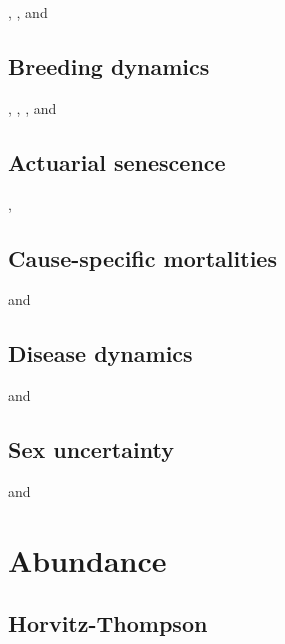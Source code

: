 \documentclass[
  12pt,
]{krantz}
\begin{document}
\citet{morano_life-history_2013}, \citet{shefferson_life_2003}, and \citet{cruz-flores_sex-specific_nodate}

\hypertarget{breeding-dynamics}{%
\section{Breeding dynamics}\label{breeding-dynamics}}

\citet{pradel_breeding_2012}, \citet{desprez_now_2011}, \citet{desprez_known_2013}, and \citet{pacoureau_population_2019}

\hypertarget{actuarial-senescence}{%
\section{Actuarial senescence}\label{actuarial-senescence}}

\citet{choquet_semi-markov_2011}, \citet{peron_evidence_2016}

\hypertarget{cause-specific-mortalities}{%
\section{Cause-specific mortalities}\label{cause-specific-mortalities}}

\citet{fernandez-chacon_causes_2016} and \citet{ruette_comparative_2015}

\hypertarget{disease-dynamics}{%
\section{Disease dynamics}\label{disease-dynamics}}

\citet{MarescotEtAl2018} and \citet{santoro_multi-event_2014}

\hypertarget{sex-uncertainty}{%
\section{Sex uncertainty}\label{sex-uncertainty}}

\citet{PradelEtAl2008} and \citet{genovart_exploiting_2012}

\hypertarget{abundance}{%
\chapter{Abundance}\label{abundance}}

\hypertarget{horvitz-thompson}{%
\section{Horvitz-Thompson}\label{horvitz-thompson}}
\end{document}
